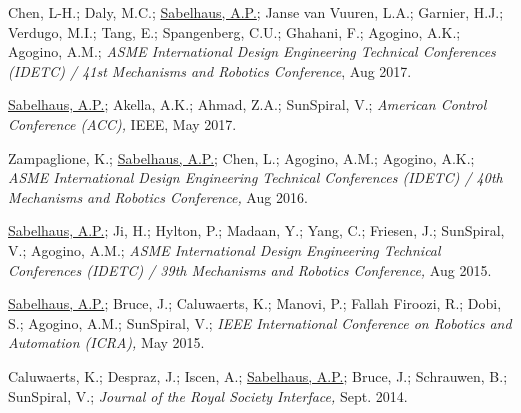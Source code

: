 \documentclass[letterpaper]{deedy-resume} %
\begin{document}
{%

\begin{etaremune}

\item {} Chen, L-H.;  Daly, M.C.; \underline{Sabelhaus, A.P.}; Janse van Vuuren, L.A.; Garnier, H.J.; Verdugo, M.I.; Tang, E.; Spangenberg, C.U.; Ghahani, F.; Agogino, A.K.; Agogino, A.M.; {\it ASME International Design Engineering Technical Conferences (IDETC) / 41st Mechanisms and Robotics Conference}, Aug 2017.

\item {} \underline{Sabelhaus, A.P.}; Akella, A.K.; Ahmad, Z.A.; SunSpiral, V.; {\it American Control Conference (ACC),} IEEE, May 2017.
  
\item {} Zampaglione, K.; \underline{Sabelhaus, A.P.};  Chen, L.;  Agogino, A.M.;  Agogino, A.K.;  {\it ASME International Design Engineering Technical Conferences (IDETC) / 40th Mechanisms and Robotics Conference,} Aug 2016.
  
\item {} \underline{Sabelhaus, A.P.}; Ji, H.; Hylton, P.; Madaan, Y.; Yang, C.; Friesen, J.; SunSpiral, V.; Agogino, A.M.; {\it ASME International Design Engineering Technical Conferences (IDETC) / 39th Mechanisms and Robotics Conference,} Aug 2015.

\item {} \underline{Sabelhaus, A.P.}; Bruce, J.; Caluwaerts, K.; Manovi, P.; Fallah Firoozi, R.; Dobi, S.; Agogino, A.M.; SunSpiral, V.; {\it IEEE International Conference on Robotics and Automation (ICRA),} May 2015.

\item {} Caluwaerts, K.; Despraz, J.; Iscen, A.; \underline{Sabelhaus, A.P.}; Bruce, J.; Schrauwen, B.; SunSpiral, V.;  {\it Journal of the Royal Society Interface,} Sept. 2014.


\end{etaremune}}
\end{document}
